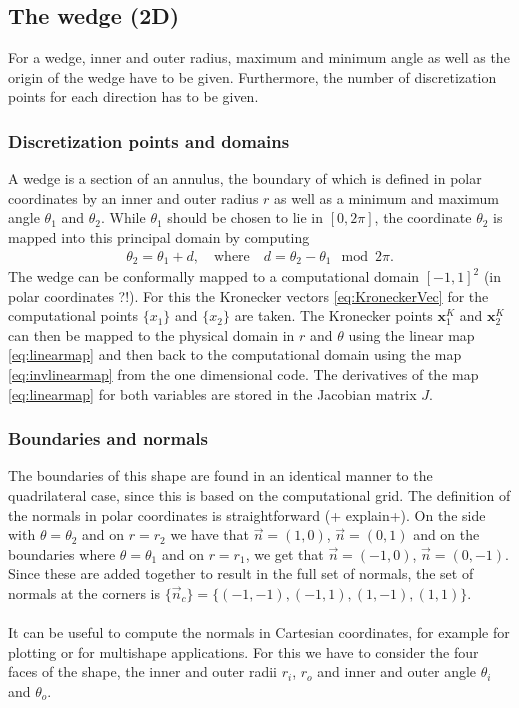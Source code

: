 \subsection{The wedge (2D)}
For a wedge, inner and outer radius, maximum and minimum angle as well as the origin of the wedge have to be given. Furthermore, the number of discretization points for each direction has to be given.
\subsubsection{Discretization points and domains}\label{sec:2DWedgePts}
A wedge is a section of an annulus, the boundary of which is defined in polar coordinates by an inner and outer radius $r$ as well as a minimum and maximum angle $\theta_1$ and $\theta_2$. While $\theta_1$ should be chosen to lie in $[0, 2 \pi]$, the coordinate $\theta_2$ is mapped into this principal domain by computing 
\begin{align*}
	\theta_2 = \theta_1 +  d, \quad \text{where} \quad d = \theta_2 - \theta_1\mod 2 \pi.
\end{align*}
The wedge can be conformally mapped to a computational domain $[-1,1]^2$ (in polar coordinates ?!). For this the Kronecker vectors \eqref{eq:KroneckerVec} for the computational points $\{x_1\}$ and $\{x_2\}$ are taken. 
The Kronecker points $\mathbf{x}_1^{K}$ and $\mathbf{x}_2^{K}$ can then be mapped to the physical domain in $r$ and $\theta$ using the linear map \eqref{eq:linearmap} and then back to the computational domain using the map \eqref{eq:invlinearmap} from the one dimensional code. The derivatives of the map \eqref{eq:linearmap} for both variables are stored in the Jacobian matrix $J$.


\subsubsection{Boundaries and normals}
The boundaries of this shape are found in an identical manner to the quadrilateral case, since this is based on the computational grid. The definition of the normals in polar coordinates is straightforward (+ explain+). On the side with $\theta = \theta_2$ and on $r = r_2$ we have that $\vec n = (1,0)$, $\vec n = (0,1)$ and on the boundaries where $\theta = \theta_1$ and on $r = r_1$, we get that $\vec n = (-1,0)$, $\vec n = (0,-1)$. Since these are added together to result in the full set of normals, the set of normals at the corners is $\{\vec n_c\} = \{(-1,-1), (-1,1), (1,-1), (1,1)\}$. 
\\
\\
It can be useful to compute the normals in Cartesian coordinates, for example for plotting or for multishape applications. For this we have to consider the four faces of the shape, the inner and outer radii $r_i$, $r_o$ and inner and outer angle $\theta_i$ and $\theta_o$.


